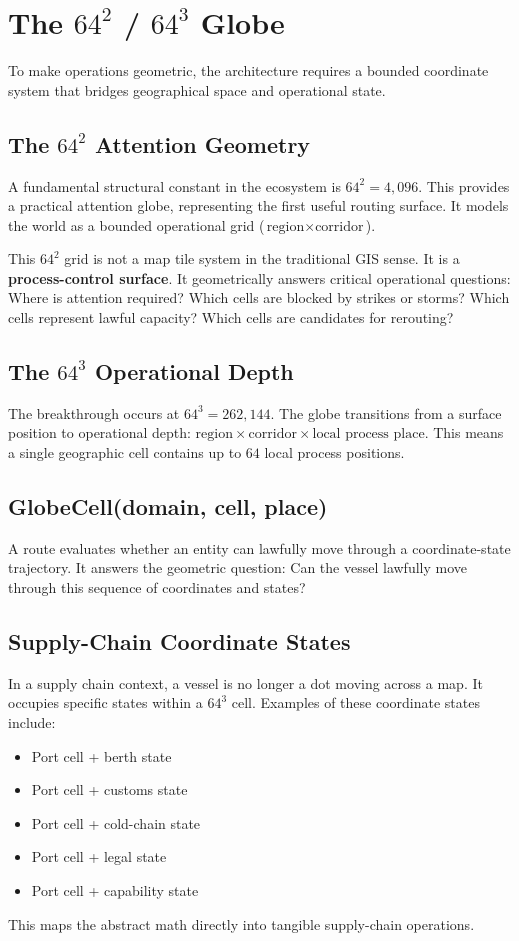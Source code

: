 \chapter{The $64^2$ / $64^3$ Globe}

To make operations geometric, the architecture requires a bounded coordinate system that bridges geographical space and operational state.

\section{The $64^2$ Attention Geometry}

A fundamental structural constant in the ecosystem is $64^2 = 4,096$. This provides a practical attention globe, representing the first useful routing surface. It models the world as a bounded operational grid ($\text{region} \times \text{corridor}$).

This $64^2$ grid is not a map tile system in the traditional GIS sense. It is a \textbf{process-control surface}. It geometrically answers critical operational questions: Where is attention required? Which cells are blocked by strikes or storms? Which cells represent lawful capacity? Which cells are candidates for rerouting? 

\section{The $64^3$ Operational Depth}

The breakthrough occurs at $64^3 = 262,144$. The globe transitions from a surface position to operational depth: $\text{region} \times \text{corridor} \times \text{local process place}$. This means a single geographic cell contains up to $64$ local process positions.

\section{GlobeCell(domain, cell, place)}

A route evaluates whether an entity can lawfully move through a coordinate-state trajectory. It answers the geometric question: Can the vessel lawfully move through this sequence of coordinates and states?

\section{Supply-Chain Coordinate States}

In a supply chain context, a vessel is no longer a dot moving across a map. It occupies specific states within a $64^3$ cell. Examples of these coordinate states include:
\begin{itemize}
    \item Port cell + berth state
    \item Port cell + customs state
    \item Port cell + cold-chain state
    \item Port cell + legal state
    \item Port cell + capability state
\end{itemize}
This maps the abstract math directly into tangible supply-chain operations.